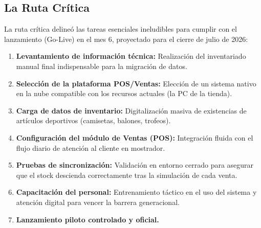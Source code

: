 \subsection{La Ruta Crítica}
La ruta crítica delineó las tareas esenciales ineludibles para cumplir con el lanzamiento (Go-Live) en el mes 6, proyectado para el cierre de julio de 2026:
\begin{enumerate}
    \item \textbf{Levantamiento de información técnica:} Realización del inventariado manual final indispensable para la migración de datos.
    \item \textbf{Selección de la plataforma POS/Ventas:} Elección de un sistema nativo en la nube compatible con los recursos actuales (la PC de la tienda).
    \item \textbf{Carga de datos de inventario:} Digitalización masiva de existencias de artículos deportivos (camisetas, balones, trofeos).
    \item \textbf{Configuración del módulo de Ventas (POS):} Integración fluida con el flujo diario de atención al cliente en mostrador.
    \item \textbf{Pruebas de sincronización:} Validación en entorno cerrado para asegurar que el stock descienda correctamente tras la simulación de cada venta.
    \item \textbf{Capacitación del personal:} Entrenamiento táctico en el uso del sistema y atención digital para vencer la barrera generacional.
    \item \textbf{Lanzamiento piloto controlado y oficial.}
\end{enumerate}

